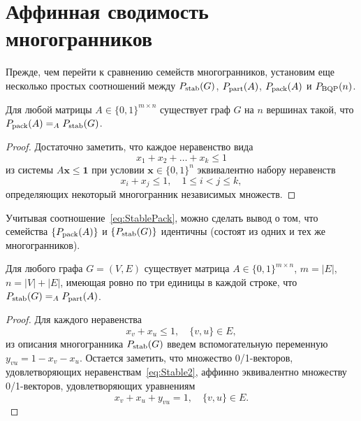 %
%

\section{Аффинная сводимость многогранников}
\label{sec:AffReductPolytopes}


Прежде, чем перейти к сравнению семейств многогранников, установим еще несколько простых соотношений между $P_{\textup{stab}}(G)$, $P_{\textup{part}}(A)$, $P_{\textup{pack}}(A)$ и $P_{\textup{BQP}}(n)$.

\begin{lemma}
	\label{lem:PackStable}
	Для любой матрицы $A\in\{0,1\}^{m\times n}$ существует граф $G$ на $n$ вершинах такой, что $P_{\textup{pack}}(A) =_A P_{\textup{stab}}(G)$.
\end{lemma}

\begin{proof}
	Достаточно заметить, что каждое неравенство вида
	$$
	x_1 + x_2 + \ldots + x_k \le 1
	$$
	из системы $A\bm{x} \le \bm{1}$ при условии $\bm{x}\in \{0,1\}^n$
	эквивалентно набору неравенств
	$$
	x_i + x_j \le 1, \quad 1\le i < j \le k,
	$$
	определяющих некоторый многогранник независимых множеств.
\end{proof}

Учитывая соотношение~\eqref{eq:StablePack}, можно сделать вывод о том, что семейства $\{P_{\textup{pack}}(A)\}$ и $\{P_{\textup{stab}}(G)\}$ идентичны (состоят из одних и тех же многогранников).

\begin{lemma}
	\label{lem:StablePart}
	Для любого графа $G=(V,E)$ существует матрица $A\in\{0,1\}^{m\times n}$, $m = |E|$, $n = |V|+|E|$, имеющая ровно по три единицы в каждой строке, что $P_{\textup{stab}}(G) =_A P_{\textup{part}}(A)$.
\end{lemma}
	
\begin{proof}
	Для каждого неравенства 
	\begin{equation}
		\label{eq:Stable2}
		x_v + x_u \le 1,  \quad \{v,u\} \in E,
	\end{equation}
	из описания многогранника $P_{\textup{stab}}(G)$ введем вспомогательную переменную $y_{vu} = 1 - x_v - x_u$.
	Остается заметить, что множество 0/1-векторов, удовлетворяющих неравенствам~\eqref{eq:Stable2}, аффинно эквивалентно множеству 0/1-векторов, удовлетворяющих уравнениям
	\begin{equation*}
		x_v + x_u + y_{vu} = 1,  \quad \{v,u\} \in E.
	\end{equation*}
\end{proof}

